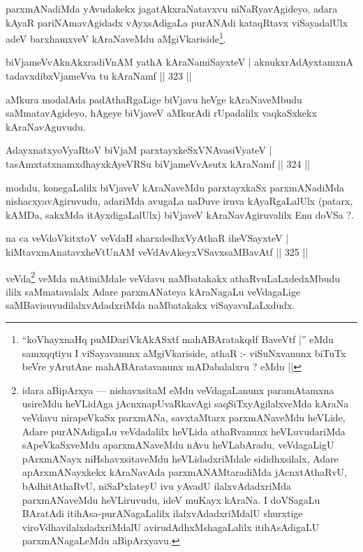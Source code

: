 \begin{artha}
parxmANadiMda yAvudakekx jagatAkxraNatavxvu niNaRyavAgideyo, adara kAyaR pariNAmavAgidadx vAyxsAdigaLa purANAdi kataqRtavx viSayadalUlx adeV barxhamxveV kAraNaveMdu aMgiVkariside\footnote[1]{``koVhayxnaHq puMDariVkAkASxtf mahABAratakqdf BaveVtf |'' eMdu samxqqtiyu I viSayavanunx aMgiVkariside, athaR :- viSuNxvanunx biTuTx beVre yArutAne mahABAratavanunx mADabalalxru ? eMdu ||}.
\end{artha}


\begin{shl}
biVjameVvAknAkxradiVnAM yathA kAraNamiSayxteV |
aknukxrAdAyxtamxnA tadavxdibxVjameVva tu kAraNamf \hfill || 323 ||
\end{shl}

\begin{artha}
aMkura modalAda padAthaRgaLige biVjavu heVge kAraNaveMbudu saMmata\-vAgideyo, hAgeye biVjaveV aMkurAdi rUpadalilx vaqkaSxkekx kAraNavAguvudu.
\end{artha}

		\begin{shl}
AdayxnatxyoVyaRtoV biVjaM parxtayxkeSxVNAvasiVyateV |
tasAmxtatxnamxdhayxkAyeVRSu biVjameVvAsutx kAraNamf \hfill || 324 ||
\end{shl}

\begin{artha}
modalu, konegaLalilx biVjaveV kAraNaveMdu parxtayxkaSx parxmANadiMda nishacxya\-vAgiruvudu, adariMda avugaLa naDuve iruva kAyaRgaLalUlx (patarx, kAMDa, sakxMda itAyxdigaLalUlx) biVjaveV kAraNavAgiruvalilx Enu doVSa ?.
\end{artha}


\begin{shl}
na ca veVdoVkitxtoV veVdaH sharxdedhxVyAthaR iheVSayxteV |
kiMtavxmAnatavxheVtUnAM veVdAvAkeyxVSavxsaMBavAtf \hfill || 325 ||
\end{shl}

\begin{artha}
veVda\footnote[1]{idara aBipArxya  {\rm ---}  nishavxsitaM eMdu veVdagaLanunx paramAtamxna usireMdu heVLidAga jAcnxnapUvaRkavAgi saqSiTxyAgilalxveMda kAraNa veVdavu nirapeVkaSx parxmANa, savxtaMtarx parxmANaveMdu heVLide, Adare purANAdigaLu veVdadalilx heVLida athaRvanunx heVLuvudariMda sApeVkaSxveMdu aparxmANaveMdu nAvu heVLabAradu, veVdagaLigU pArxmANayx niHshavxsitaveMdu heVLidadxriMdale sididhxsilalx, Adare apArxmANayxkekx kAraNavAda parxmANAMtaradiMda jAcnxtAthaRvU, bAdhitAthaRvU, niSaPxlateyU ivu yAvadU ilalxvAdadxriMda parxmANaveMdu heVLiruvudu, ideV muKayx kAraNa. I doVSagaLu BAratAdi itihAsa-purANagaLalilx ilalxvAdadxriMdalU shurxtige viroVdhavilalxdadxriMdalU avirudAdhxMshagaLalilx itihAsAdigaLU parxmANagaLeMdu aBipArxyavu.} veMda mAtiniMdale veVdavu naMbatakakx athaRvuLaLxdedxMbudu ililx \break saMmatavalalx Adare parxmANateya kAraNagaLu veVdagaLige saMBavisuvudilalxvAdadx\-riMda naMbatakakx viSayavuLaLxdudx.
\end{artha}

